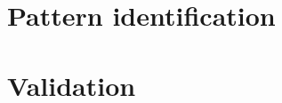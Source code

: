\section{Pattern identification}

\section{Validation}

\begin{comment}
\section{Wavelets in software evolution}
The use of wavelet transformation in the analysis of software evolution removes
the factor of project size and enables comparing projects equally to find
similar sequences.

\paragraph{}
In software evolution, the signal can be any measurable property of an evolving
entity, such as team size, lines of code, number of commits, etc.
These properties can be measured at a given time series, such as age in months,
or even a non-time-related series such as lines of code. Measuring these
properties over the evolution of a project gives a series of signals. Software
repositories are a source of signals in software evolution. This allows wavelet
transform be applied directly for mining software repositories.

\section{Warning signs}
\subsection{Dead projects}
The validation of the sequence identification was done by first classifying
a subset of the data set containing only dead projects. A dead project is
defined as a project that had no change in LOC in the past 12 months.\\

The list of dead projects is then used to filter the sequences detected by
these dead projects. The resulting set of sequences contains just the sequences
in dead projects. Each sequence is related to other sequences in other projects
which might be dead or not. These related projects are evaluated by checking if
they exist in the dead projects list.


\end{comment}
